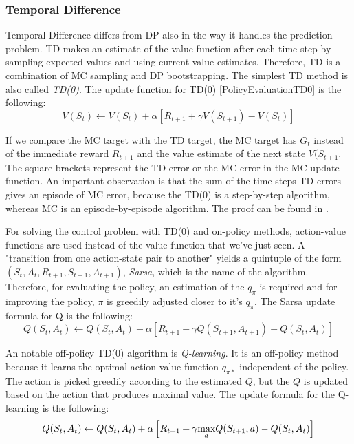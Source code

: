 \subsubsection{Temporal Difference}\label{Temporal Difference}
Temporal Difference differs from DP also in the way it handles the prediction problem. TD makes an estimate of the value function after each time step by sampling expected values and using current value estimates. Therefore, TD is a combination of MC sampling and DP bootstrapping. The simplest TD method is also called \textit{TD(0)}. The update function for TD(0) \ref{PolicyEvaluationTD0} is the following:
\begin{equation}\label{PolicyEvaluationTD0}
V(S_{t})\leftarrow V(S_{t})+\alpha \left [ R_{t+1}+\gamma V(S_{t+1})-V(S_{t}) \right ]
\end{equation}

If we compare the MC target with the TD target, the MC target has $G_{t}$ instead of the immediate reward $R_{t+1}$ and the value estimate of the next state $V(S_{t+1}$. The square brackets represent the TD error or the MC error in the MC update function. An important observation is that the sum of the time steps TD errors gives an episode of MC error, because the TD(0) is a step-by-step algorithm, whereas MC is an episode-by-episode algorithm. The proof can be found in \cite{Sutton}.

For solving the control problem with TD(0) and on-policy methods, action-value functions are used instead of the value function that we've just seen. A "transition from one action-state pair to another" \cite{Sutton} yields a quintuple of the form $(S_{t}, A_{t}, R_{t+1}, S_{t+1}, A_{t+1})$, \textit{Sarsa}, which is the name of the algorithm. Therefore, for evaluating the policy, an estimation of the $q_{\pi}$ is required and for improving the policy, $\pi$ is greedily adjusted closer to it's $q_{\pi}$. The Sarsa update formula for Q is the following:
\begin{equation}\label{Sarsa}
Q(S_{t}, A_{t})\leftarrow Q(S_{t}, A_{t})+\alpha \left [ R_{t+1}+\gamma Q(S_{t+1}, A_{t+1})-Q(S_{t}, A_{t}) \right ]
\end{equation}

An notable off-policy TD(0) algorithm is \textit{Q-learning}. It is an off-policy method because it learns the optimal action-value function $q_{\pi*}$ independent of the policy. The action is picked greedily according to the estimated $Q$, but the $Q$ is updated based on the action that produces maximal value. The update formula for the Q-learning is the following:
\begin{equation}\label{Qlearning}
Q(S_{t}, A_{t})\leftarrow Q(S_{t}, A_{t})+\alpha \left [ R_{t+1}+\gamma \underset{a}{\textup{max}} Q(S_{t+1}, a)-Q(S_{t}, A_{t}) \right ]
\end{equation}

